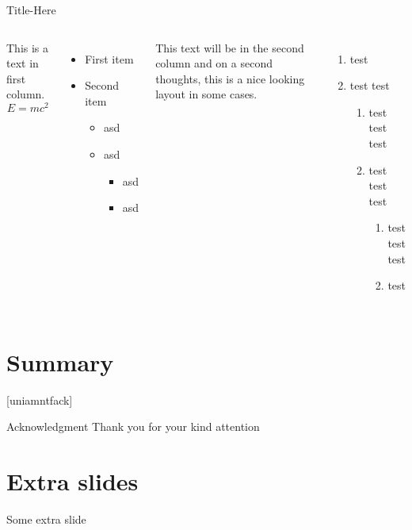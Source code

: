 \documentclass[aspectratio=169]{beamer}
\begin{document}
    \begin{frame}{Title-Here}
        \begin{columns}
                This is a text in first column.
                $$E=mc^2$$
                \begin{itemize}
                    \item First item
                    \item Second item
                    \begin{itemize}
                        \item asd
                        \item asd
                        \begin{itemize}
                            \item asd
                            \item asd
                        \end{itemize}
                    \end{itemize}
                \end{itemize}
            
                This text will be in the second column
                and on a second thoughts, this is a nice looking
                layout in some cases.
                \begin{enumerate}
                    \item test
                    \item test test
                    \begin{enumerate}
                        \item test test test
                        \item test test test
                        \begin{enumerate}
                            \item test test test
                            \item test
                        \end{enumerate}
                    \end{enumerate}
                \end{enumerate}
        \end{columns}
    \end{frame}

    \section{Summary}
    {
        [uniamntfack] %
        \begin{frame}[plain]{Acknowledgment}
            Thank you for your kind attention
        \end{frame}
    }

    \section*{Extra slides} %
    \begin{frame}{Some extra slide}
    \end{frame}
\end{document}
